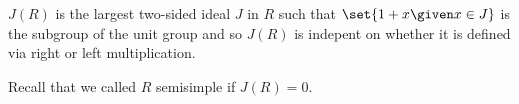 $J(R)$ is the largest two-sided ideal $J$ in $R$ such that $\set{1+x\given x \in J}$
is the subgroup of the unit group and so $J(R)$ is indepent on whether it is defined
via right or left multiplication.

Recall that we called $R$ semisimple if $J(R) = 0$.
